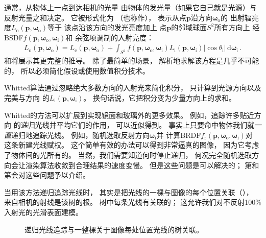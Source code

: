 通常，从物体上一点到达相机的光量
由物体的发光量（如果它自己就是光源）与反射光量之和决定。
它被形式化为
（也称作），
表示从点$\bm p$沿方向${\bm \omega}_\mathrm{o}$的
出射辐亮度$L_{\mathrm{o}}({\bm p},{\bm \omega}_\mathrm{o})$等于
该点沿该方向的发光亮度加上
点$\bm p$的邻域球面$S^2$所有方向上
经BSDF$f({\bm p},{\bm \omega}_\mathrm{o},{\bm \omega}_\mathrm{i})$和
余弦项调制的入射亮度：
\begin{align}
      L_{\mathrm{o}}({\bm p},{\bm \omega}_\mathrm{o})=L_{\mathrm{e}}({\bm p},{\bm \omega}_\mathrm{o})+\int_{S^2}f({\bm p},{\bm \omega}_\mathrm{o},{\bm \omega}_\mathrm{i})L_{\mathrm{i}}({\bm p},{\bm \omega}_\mathrm{i})|\cos{\theta_{\mathrm{i}}}| \,\mathrm{d}{\bm \omega}_\mathrm{i}\, .
      \label{eq:1.1}
\end{align}
和将展示其更完整的推导。
除了最简单的场景，
解析地求解该方程是几乎不可能的，
所以必须简化假设或使用数值积分技术。

Whitted算法通过忽略绝大多数方向的入射光来简化积分，
只计算到光源方向以及
完美与方向
的$L_{\mathrm{i}}({\bm p},{\bm \omega}_\mathrm{i})$。
换句话说，它把积分变为少量方向上的求和。

Whitted的方法可以扩展到实现镜面和玻璃外的更多效果。
例如，追踪许多贴近方向
的递归光线并平均它们的作用，
可以近似得到。
事实上只要命中物体我们就\emph{一直}递归地追踪光线。
例如，随机选取反射方向${\bm \omega}_\mathrm{i}$并
计算BRDF$f_{\mathrm{r}}({\bm p},{\bm \omega}_\mathrm{o},{\bm \omega}_\mathrm{i})$对
这条新建光线赋权。
这个简单有效的办法可以得到非常逼真的图像，
因为它考虑了物体间的光所有的。
当然，我们需要知道何时停止递归，
何况完全随机选取方向会让渲染算法收敛到合理结果的速度变慢。
但是这些问题是可以解决的；
第和第会对这些问题予以介绍。

当用该方法递归追踪光线时，
其实是把光线的一棵与图像的每个位置关联（），
来自相机的射线是该树的根。
树中每条光线有关联的；
这允许我们对不反射100\%入射光的光滑表面建模。
\begin{figure}[htbp]
      \centering
      \caption{递归光线追踪与一整棵关于图像每处位置光线的树关联。}\label{fig:1.8}
\end{figure}

